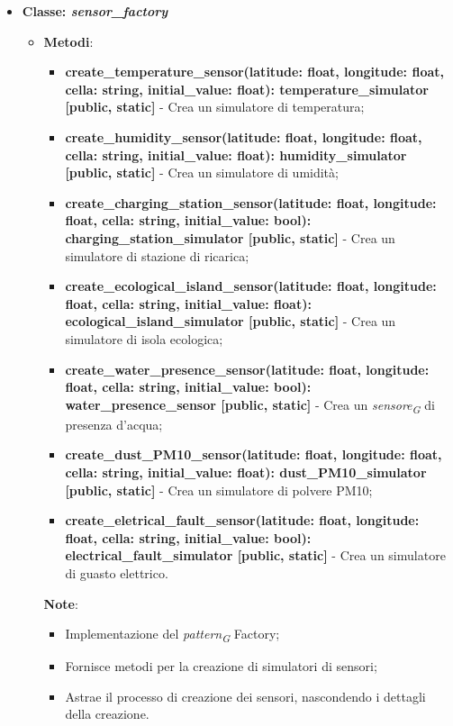 \begin{itemize}
    \item{\textbf{Classe: \textit{sensor\_factory}}}
    \begin{itemize}
        \item \textbf{Metodi}: 
        \begin{itemize}
            \item \textbf{create\_temperature\_sensor(latitude: float, longitude: float, cella: string, initial\_value: float): temperature\_simulator [public, static]} - Crea un simulatore di temperatura;

            \item \textbf{create\_humidity\_sensor(latitude: float, longitude: float, cella: string, initial\_value: float): humidity\_simulator [public, static]} - Crea un simulatore di umidità;
            
            \item \textbf{create\_charging\_station\_sensor(latitude: float, longitude: float, cella: string, initial\_value: bool): charging\_station\_simulator [public, static]} - Crea un simulatore di stazione di ricarica;
            
            \item \textbf{create\_ecological\_island\_sensor(latitude: float, longitude: float, cella: string, initial\_value: float): ecological\_island\_simulator [public, static]} - Crea un simulatore di isola ecologica;
            
            \item \textbf{create\_water\_presence\_sensor(latitude: float, longitude: float, cella: string, initial\_value: bool): water\_presence\_sensor [public, static]} - Crea un \textit{sensore}\textsubscript{\textit{G}} di presenza d'acqua;
            
            \item \textbf{create\_dust\_PM10\_sensor(latitude: float, longitude: float, cella: string, initial\_value: float): dust\_PM10\_simulator [public, static]} - Crea un simulatore di polvere PM10;
            
            \item \textbf{create\_eletrical\_fault\_sensor(latitude: float, longitude: float, cella: string, initial\_value: bool): electrical\_fault\_simulator [public, static]} - Crea un simulatore di guasto elettrico.
        \end{itemize}
    \textbf{Note}:
        \begin{itemize}
            \item Implementazione del \textit{pattern}\textsubscript{\textit{G}} Factory;
            \item Fornisce metodi per la creazione di simulatori di sensori;
            \item Astrae il processo di creazione dei sensori, nascondendo i dettagli della creazione.
        \end{itemize}
    \end{itemize}
\end{itemize}

